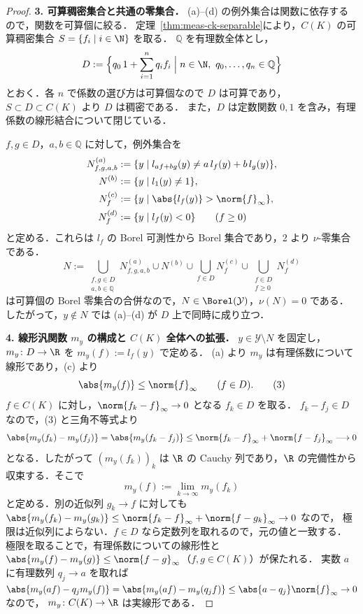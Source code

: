 \begin{proof}
  \textbf{3. 可算稠密集合と共通の零集合．}
  (a)--(d) の例外集合は関数に依存するので，関数を可算個に絞る．
  定理~\ref{thm:meas-ck-separable}により，$C(K)$ の可算稠密集合 $S=\{f_i\mid i\in\N\}$ を取る．
  $\mathbb{Q}$ を有理数全体とし，
  \[
    D:=\Bigl\{q_0\,1+\sum_{i=1}^nq_if_i\Bigm| n\in\N,\ q_0,\dots,q_n\in\mathbb{Q}\Bigr\}
  \]
  とおく．各 $n$ で係数の選び方は可算個なので $D$ は可算であり，
  $S\subset D\subset C(K)$ より $D$ は稠密である．
  また，$D$ は定数関数 $0,1$ を含み，有理係数の線形結合について閉じている．

  $f,g\in D$，$a,b\in\mathbb{Q}$ に対して，例外集合を
  \[
    \begin{aligned}
      N^{(a)}_{f,g,a,b}&:=\{y\mid l_{af+bg}(y)\neq a\,l_f(y)+b\,l_g(y)\},\\
      N^{(b)}&:=\{y\mid l_1(y)\neq1\},\\
      N^{(c)}_f&:=\{y\mid\abs{l_f(y)}>\norm{f}_\infty\},\\
      N^{(d)}_f&:=\{y\mid l_f(y)<0\}\qquad(f\geq0)
    \end{aligned}
  \]
  と定める．これらは $l_f$ の Borel 可測性から Borel 集合であり，2 より $\nu$-零集合である．
  \[
    N:=\bigcup_{\substack{f,g\in D\\a,b\in\mathbb{Q}}}N^{(a)}_{f,g,a,b}
      \cup N^{(b)}\cup\bigcup_{f\in D}N^{(c)}_f
      \cup\bigcup_{\substack{f\in D\\f\geq0}}N^{(d)}_f
  \]
  は可算個の Borel 零集合の合併なので，$N\in\Borel(\mathcal{Y})$，$\nu(N)=0$ である．
  したがって，$y\notin N$ では (a)--(d) が $D$ 上で同時に成り立つ．

  \textbf{4. 線形汎関数 $m_y$ の構成と $C(K)$ 全体への拡張．}
  $y\in\mathcal{Y}\setminus N$ を固定し，$m_y\colon D\to\R$ を $m_y(f):=l_f(y)$ で定める．
  (a) より $m_y$ は有理係数について線形であり，(c) より
  \[
    \abs{m_y(f)}\leq\norm{f}_\infty\qquad(f\in D).\tag{3}
  \]
  $f\in C(K)$ に対し，$\norm{f_k-f}_\infty\to0$ となる $f_k\in D$ を取る．
  $f_k-f_j\in D$ なので，(3) と三角不等式より
  \[
    \abs{m_y(f_k)-m_y(f_j)}=\abs{m_y(f_k-f_j)}\leq\norm{f_k-f}_\infty+\norm{f-f_j}_\infty\longrightarrow0
  \]
  となる．したがって $(m_y(f_k))_k$ は $\R$ の Cauchy 列であり，$\R$ の完備性から収束する．そこで
  \[
    m_y(f):=\lim_{k\to\infty}m_y(f_k)
  \]
  と定める．別の近似列 $g_k\to f$ に対しても
  $\abs{m_y(f_k)-m_y(g_k)}\leq\norm{f_k-f}_\infty+\norm{f-g_k}_\infty\to0$ なので，
  極限は近似列によらない．$f\in D$ なら定数列を取れるので，元の値と一致する．
  極限を取ることで，有理係数についての線形性と
  $\abs{m_y(f)-m_y(g)}\leq\norm{f-g}_\infty$（$f,g\in C(K)$）が保たれる．
  実数 $a$ に有理数列 $q_j\to a$ を取れば
  $\abs{m_y(af)-q_jm_y(f)}=\abs{m_y(af)-m_y(q_jf)}\leq\abs{a-q_j}\norm{f}_\infty\to0$ なので，
  $m_y\colon C(K)\to\R$ は実線形である．


\end{proof}
